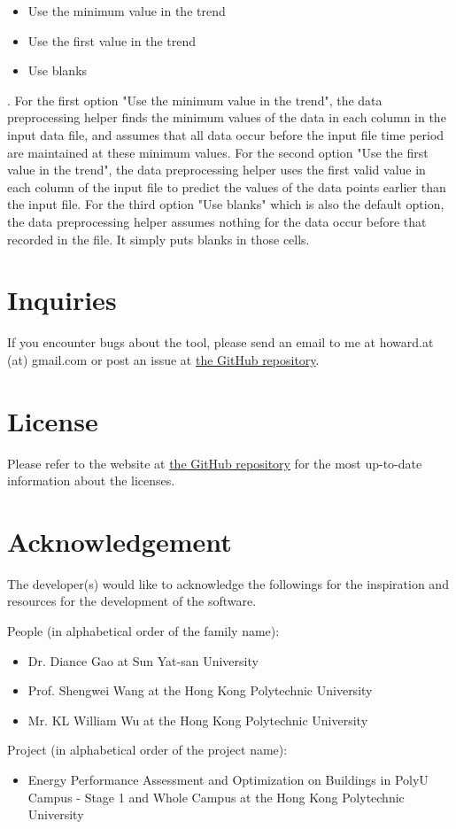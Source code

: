 \documentclass[12pt,a4paper]{article}
\begin{document}
\begin{itemize}
\item Use the minimum value in the trend
\item Use the first value in the trend
\item Use blanks
\end{itemize}

.
For the first option "Use the minimum value in the trend", the data preprocessing helper finds the minimum values of the data in each column in the input data file, and assumes that all data occur before the input file time period are maintained at these minimum values.
For the second option "Use the first value in the trend", the data preprocessing helper uses the first valid value in each column of the input file to predict the values of the data points earlier than the input file.
For the third option "Use blanks" which is also the default option, the data preprocessing helper assumes nothing for the data occur before that recorded in the file.
It simply puts blanks in those cells.

\section{Inquiries}

If you encounter bugs about the tool, please send an email to me at howard.at (at) gmail.com or post an issue at \href{https://github.com/howardcheung/data-preprocessing-helper/}{the GitHub repository}.

\section{License}

Please refer to the website at \href{https://github.com/howardcheung/data-preprocessing-helper/}{the GitHub repository} for the most up-to-date information about the licenses.

\section{Acknowledgement}

The developer(s) would like to acknowledge the followings for the inspiration and resources for the development of the software.

People (in alphabetical order of the family name):
\begin{itemize}
\item Dr. Diance Gao at Sun Yat-san University
\item Prof. Shengwei Wang at the Hong Kong Polytechnic University
\item Mr. KL William Wu at the Hong Kong Polytechnic University
\end{itemize}

Project (in alphabetical order of the project name):
\begin{itemize}
\item Energy Performance Assessment and Optimization on Buildings in PolyU Campus - Stage 1 and Whole Campus at the Hong Kong Polytechnic University
\end{itemize}
\end{document}
